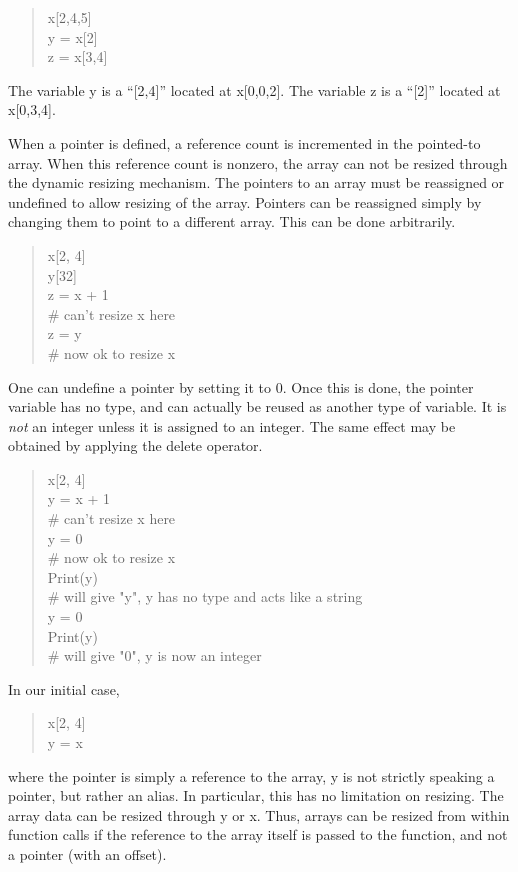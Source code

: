 \begin{quote}\vt
x[2,4,5]\\
y = x[2]\\
z = x[3,4]
\end{quote}

The variable {\vt y} is a ``[2,4]'' located at {\vt x[0,0,2]}.  The
variable {\vt z} is a ``[2]'' located at {\vt x[0,3,4]}.

When a pointer is defined, a reference count is incremented in the
pointed-to array.  When this reference count is nonzero, the array can
not be resized through the dynamic resizing mechanism.  The pointers
to an array must be reassigned or undefined to allow resizing of the
array.  Pointers can be reassigned simply by changing them to point to
a different array.  This can be done arbitrarily.
\begin{quote}\vt
x[2, 4]\\
y[32]\\
z = x + 1\\
\# can't resize x here\\
z = y\\
\# now ok to resize x
\end{quote}

One can undefine a pointer by setting it to 0.  Once this is done, the
pointer variable has no type, and can actually be reused as another
type of variable.  It is {\it not} an integer unless it is assigned to
an integer.  The same effect may be obtained by applying the {\vt
delete} operator.
\begin{quote}\vt
x[2, 4]\\
y = x + 1\\
\# can't resize x here\\
y = 0\\
\# now ok to resize x\\
Print(y)\\
\# will give "y", y has no type and acts like a string\\
y = 0\\
Print(y)\\
\# will give "0", y is now an integer
\end{quote}

In our initial case,
\begin{quote}\vt
x[2, 4]\\
y = x
\end{quote}
where the pointer is simply a reference to the array, {\vt y} is not
strictly speaking a pointer, but rather an alias.  In particular, this
has no limitation on resizing.  The array data can be resized through
{\vt y} or {\vt x}.  Thus, arrays can be resized from within function
calls if the reference to the array itself is passed to the function,
and not a pointer (with an offset).

